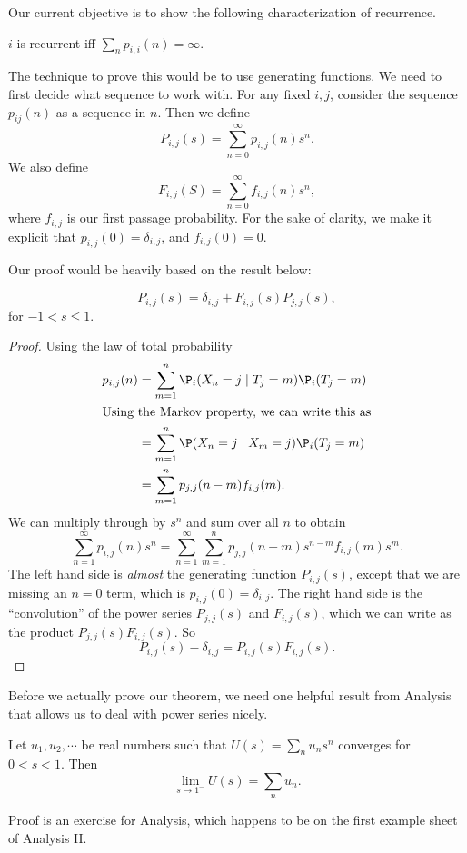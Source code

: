 \documentclass[a4paper]{article}
\begin{document}
Our current objective is to show the following characterization of recurrence.
\begin{thm}
  $i$ is recurrent iff $\sum_n p_{i, i}(n) = \infty$.
\end{thm}
The technique to prove this would be to use generating functions. We need to first decide what sequence to work with. For any fixed $i, j$, consider the sequence $p_{ij}(n)$ as a sequence in $n$. Then we define
\[
  P_{i, j}(s) = \sum_{n = 0}^\infty p_{i, j}(n) s^n.
\]
We also define
\[
  F_{i, j}(S) = \sum_{n = 0}^\infty f_{i, j}(n) s^n,
\]
where $f_{i, j}$ is our first passage probability. For the sake of clarity, we make it explicit that $p_{i, j}(0) = \delta_{i, j}$, and $f_{i, j}(0) = 0$.

Our proof would be heavily based on the result below:
\begin{thm}
  \[
    P_{i, j}(s) = \delta_{i, j} + F_{i, j}(s)P_{j, j}(s),
  \]
  for $-1 < s \leq 1$.
\end{thm}

\begin{proof}
  Using the law of total probability
  \begin{align*}
    p_{i, j}(n) &= \sum_{m = 1}^n \P_i(X_n = j\mid T_j = m) \P_i(T_j = m) \\
    \intertext{Using the Markov property, we can write this as}
    &= \sum_{m = 1}^n \P(X_n = j\mid X_m = j) \P_i(T_j = m)\\
    &= \sum_{m = 1}^n p_{j, j}(n - m) f_{i, j}(m).
  \end{align*}
  We can multiply through by $s^n$ and sum over all $n$ to obtain
  \[
    \sum_{n = 1}^\infty p_{i, j}(n) s^n = \sum_{n = 1}^\infty \sum_{m = 1}^n p_{j, j}(n - m)s^{n - m} f_{i, j}(m)s^m.
  \]
  The left hand side is \emph{almost} the generating function $P_{i, j}(s)$, except that we are missing an $n = 0$ term, which is $p_{i, j}(0) = \delta_{i, j}$. The right hand side is the ``convolution'' of the power series $P_{j, j}(s)$ and $F_{i, j}(s)$, which we can write as the product $P_{j, j}(s) F_{i, j}(s)$. So
  \[
    P_{i, j}(s) - \delta_{i, j} = P_{i, j}(s) F_{i, j}(s).
  \]
\end{proof}

Before we actually prove our theorem, we need one helpful result from Analysis that allows us to deal with power series nicely.
\begin{lemma}
  Let $u_1, u_2, \cdots$ be real numbers such that $U(s) = \sum_{n} u_n s^n$ converges for $0 < s < 1$. Then
  \[
    \lim_{s\to 1^-} U(s) = \sum_n u_n.
  \]
\end{lemma}
Proof is an exercise for Analysis, which happens to be on the first example sheet of Analysis II.
\end{document}
